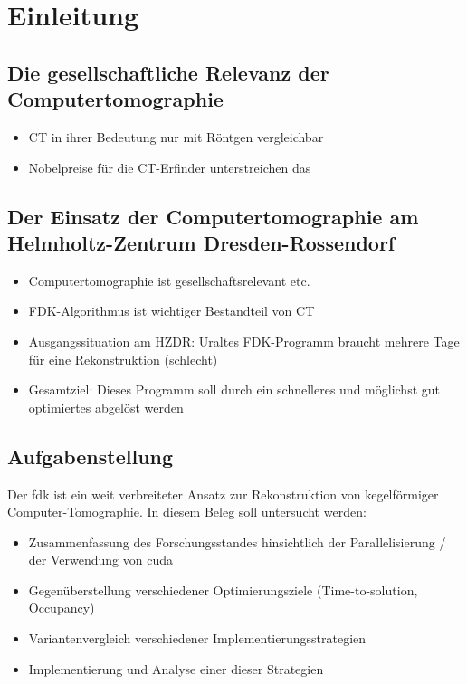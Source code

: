 \chapter{Einleitung}

\section{Die gesellschaftliche Relevanz der Computertomographie}

\begin{itemize}
    \item CT in ihrer Bedeutung nur mit Röntgen vergleichbar
    \item Nobelpreise für die CT-Erfinder unterstreichen das
\end{itemize}

\section{Der Einsatz der Computertomographie am Helmholtz-Zentrum Dresden-Rossendorf}

\begin{itemize}
    \item Computertomographie ist gesellschaftsrelevant etc.
    \item FDK-Algorithmus ist wichtiger Bestandteil von CT
    \item Ausgangssituation am HZDR: Uraltes FDK-Programm braucht mehrere Tage für eine Rekonstruktion (schlecht)
    \item Gesamtziel: Dieses Programm soll durch ein schnelleres und möglichst gut optimiertes abgelöst werden
\end{itemize}

\section{Aufgabenstellung}

Der \gls{fdk} ist ein weit verbreiteter Ansatz zur Rekonstruktion von kegelförmiger Computer-Tomographie. In diesem
Beleg soll untersucht werden:

\begin{itemize}
    \item Zusammenfassung des Forschungsstandes hinsichtlich der Parallelisierung / der Verwendung von \gls{cuda}
    \item Gegenüberstellung verschiedener Optimierungsziele (Time-to-solution, Occupancy)
    \item Variantenvergleich verschiedener Implementierungsstrategien
    \item Implementierung und Analyse einer dieser Strategien
\end{itemize}
